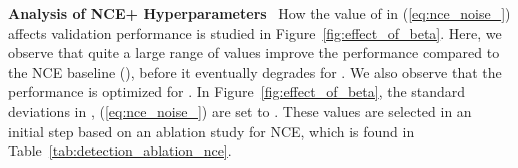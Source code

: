 \documentclass{bmvc2k}
\newcommand{\parsection}[1]{\vspace{2mm}\noindent\textbf{#1}~ }
\begin{document}
\parsection{Analysis of NCE+ Hyperparameters}
How the value of  in  (\ref{eq:nce_noise_}) affects validation performance is studied in Figure~\ref{fig:effect_of_beta}. Here, we observe that quite a large range of values improve the performance compared to the NCE baseline (), before it eventually degrades for . We also observe that the performance is optimized for . In Figure~\ref{fig:effect_of_beta}, the standard deviations  in ,  (\ref{eq:nce_noise_}) are set to . These values are selected in an initial step based on an ablation study for NCE, which is found in Table~\ref{tab:detection_ablation_nce}.


\begin{table}[t]
\centering
{}\vspace{-3.5mm}
\caption{Comparison of training methods for the object detection experiments, on the \textit{2017 test-dev} split of COCO~\cite{lin2014microsoft}. Our proposed NCE+ achieves the best performance.}\vspace{-3.0mm}
	\label{tab:comparison_object_detection}
\end{table}
\end{document}
